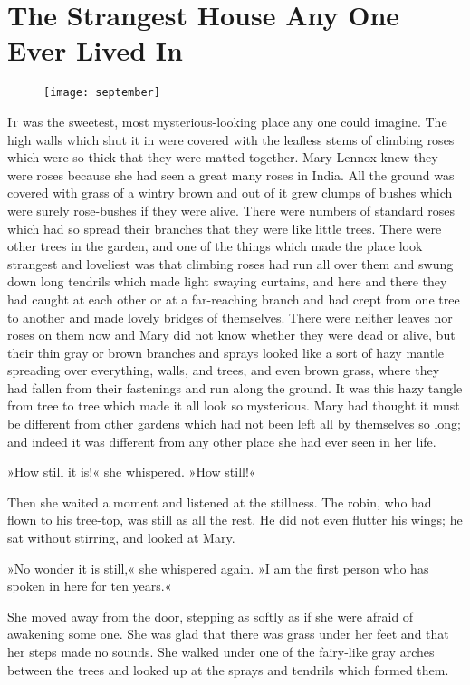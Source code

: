 \chapter{The Strangest House Any One Ever Lived In} 
\begin{figure}[t!]
\centering
\texttt{[image: september]}
\end{figure}
 \lettrine[lines=6]{I}{t} was the sweetest, most mysterious-looking place any one could imagine. The high walls which shut it in were covered with the leafless stems of climbing roses which were so thick that they were matted together. Mary Lennox knew they were roses because she had seen a great many roses in India. All the ground was covered with grass of a wintry brown and out of it grew clumps of bushes which were surely rose-bushes if they were alive. There were numbers of standard roses which had so spread their branches that they were like little trees. There were other trees in the garden, and one of the things which made the place look strangest and loveliest was that climbing roses had run all over them and swung down long tendrils which made light swaying curtains, and here and there they had caught at each other or at a far-reaching branch and had crept from one tree to another and made lovely bridges of themselves. There were neither leaves nor roses on them now and Mary did not know whether they were dead or alive, but their thin gray or brown branches and sprays looked like a sort of hazy mantle spreading over everything, walls, and trees, and even brown grass, where they had fallen from their fastenings and run along the ground. It was this hazy tangle from tree to tree which made it all look so mysterious. Mary had thought it must be different from other gardens which had not been left all by themselves so long; and indeed it was different from any other place she had ever seen in her life.

»How still it is!« she whispered. »How still!«

Then she waited a moment and listened at the stillness. The robin, who had flown to his tree-top, was still as all the rest. He did not even flutter his wings; he sat without stirring, and looked at Mary.

»No wonder it is still,« she whispered again. »I am the first person who has spoken in here for ten years.«

She moved away from the door, stepping as softly as if she were afraid of awakening some one. She was glad that there was grass under her feet and that her steps made no sounds. She walked under one of the fairy-like gray arches between the trees and looked up at the sprays and tendrils which formed them.

